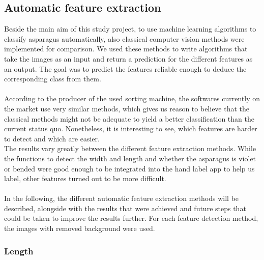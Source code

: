 \subsection{Automatic feature extraction}
\label{sec:AutomaticFeatureExtraction}

Beside the main aim of this study project, to use machine learning algorithms to classify asparagus automatically, also classical computer vision methods were implemented for comparison. We used these methods to write algorithms that take the images as an input and return a prediction for the different features as an output. The goal was to predict the features reliable enough to deduce the corresponding class from them. \\
\\
According to the producer of the used sorting machine, the softwares currently on the market use very similar methods, which gives us reason to believe that the classical methods might not be adequate to yield a better classification than the current status quo. Nonetheless, it is interesting to see, which features are harder to detect and which are easier. \\
The results vary greatly between the different feature extraction methods. While the functions to detect the width and length and whether the asparagus is violet or bended were good enough to be integrated into the hand label app to help us label, other features turned out to be more difficult. \\
\\
In the following, the different automatic feature extraction methods will be described, alongside with the results that were achieved and future steps that could be taken to improve the results further. For each feature detection method, the images with removed background were used.


\subsubsection{Length}
\label{subsec:Length}

